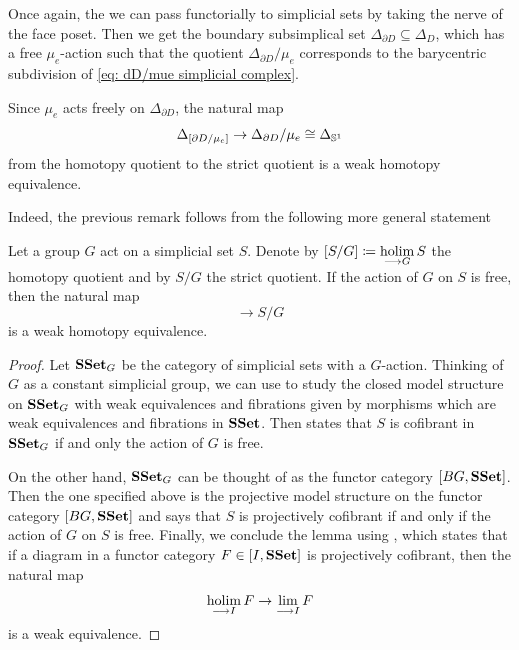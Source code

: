 Once again, the we can pass functorially to simplicial sets by taking the nerve of the face poset. Then we get the boundary subsimplical set $\Delta_{\partial D} \subseteq \Delta_D$, which has a free $\mu_e$-action such that the quotient $\Delta_{\partial D}/ \mu_e$ corresponds to the barycentric subdivision of \eqref{eq: dD/mue simplicial complex}.
\begin{rmk}
Since $\mu_e$ acts freely on $\Delta_{\partial D}$, the natural map
\begin{equation}
\Delta_{[\partial D/\mu_e]} \to \Delta_{\partial D}/\mu_e \cong \Delta_{\mathbb{S}^1}
\end{equation}
from the homotopy quotient to the strict quotient is a weak homotopy equivalence.
\end{rmk}
Indeed, the previous remark follows from the following more general statement
\begin{lemma}
Let a group $G$ act on a simplicial set $S$. Denote by $\displaystyle [S/G]\coloneqq \operatorname*{holim}_{\longrightarrow G} S$ the homotopy quotient and by $S/G$ the strict quotient. If the action of $G$ on $S$ is free, then the natural map
\begin{equation}
[S/G] \to S/G
\end{equation}
is a weak homotopy equivalence.
\end{lemma}
\begin{proof}
Let $\mathbf{SSet}_G$ be the category of simplicial sets with a $G$-action. Thinking of $G$ as a constant simplicial group, we can use \cite[\S V.2]{SimplicialHomotopyTheory} to study the closed model structure on $\mathbf{SSet}_G$ with weak equivalences and fibrations given by morphisms which are weak equivalences and fibrations in $\mathbf{SSet}$.
Then \cite[\S V Cor 2.10]{SimplicialHomotopyTheory} states that $S$ is cofibrant in $\mathbf{SSet}_G$ if and only the action of $G$ is free.

On the other hand, $\mathbf{SSet}_G$ can be thought of as the functor category $[BG, \mathbf{SSet}]$. Then the one specified above is the projective model structure on the functor category $[BG, \mathbf{SSet}]$ and \cite[\S V, Cor 2.10]{SimplicialHomotopyTheory} says that $S$ is projectively cofibrant if and only if the action of $G$ on $S$ is free. Finally, we conclude the lemma using \cite[\href{https://kerodon.net/tag/03CJ}{Tag 03CJ}]{kerodon}, which states that if a diagram in a functor category $F \in [I, \mathbf{SSet}]$ is projectively cofibrant, then the natural map
\begin{equation}
\operatorname*{holim}_{\longrightarrow I} F \to \lim_{\longrightarrow I} F
\end{equation}
is a weak equivalence.
\end{proof}

